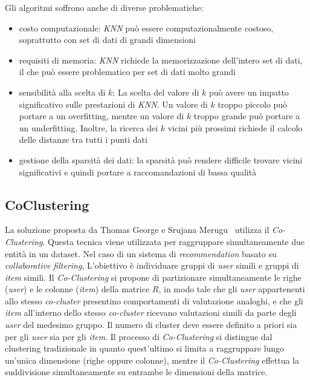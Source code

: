 Gli algoritmi soffrono anche di diverse problematiche:
\begin{itemize}
    \item costo computazionale: \textit{KNN} può essere computazionalmente costoso, soprattutto con set di dati di grandi dimensioni
    \item requisiti di memoria: \textit{KNN} richiede la memorizzazione dell'intero set di dati, il che può essere problematico per set di dati molto grandi
    \item sensibilità alla scelta di $k$: La scelta del valore di $k$ può avere un impatto significativo sulle prestazioni di \textit{KNN}. Un valore di $k$ troppo piccolo può portare a un overfitting, mentre un valore di $k$ troppo grande può portare a un underfitting. Inoltre, la ricerca dei $k$ vicini più prossimi richiede il calcolo delle distanze tra tutti i punti dati
    \item gestione della sparsità dei dati: la sparsità può rendere difficile trovare vicini significativi e quindi portare a raccomandazioni di bassa qualità
\end{itemize}

\subsection{CoClustering}\label{coclustering}

La soluzione proposta da Thomas George e Srujana Merugu~\cite{Co-Clustering} utilizza il \textit{Co-Clustering}. Questa tecnica viene utilizzata per raggruppare simultaneamente due entità in un dataset. Nel caso di un sistema di \textit{recommendation} basato su \textit{collaborative filtering}, L'obiettivo è individuare gruppi di \textit{user} simili e gruppi di \textit{item} simili. Il \textit{Co-Clustering} si propone di partizionare simultaneamente le righe (\textit{user}) e le colonne (\textit{item}) della matrice $R$, in modo tale che gli \textit{user} appartenenti allo stesso \textit{co-cluster} presentino comportamenti di valutazione analoghi, e che gli \textit{item} all'interno dello stesso \textit{co-cluster} ricevano valutazioni simili da parte degli \textit{user} del medesimo gruppo. Il numero di cluster deve essere definito a priori sia per gli \textit{user} sia per gli \textit{item}. Il processo di \textit{Co-Clustering} si distingue dal clustering tradizionale in quanto quest'ultimo si limita a raggruppare lungo un'unica dimensione (righe oppure colonne), mentre il \textit{Co-Clustering} effettua la suddivisione simultaneamente su entrambe le dimensioni della matrice.
 
